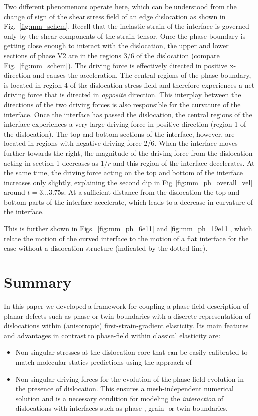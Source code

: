 \documentclass[preprint,review,3p,times,authoryear]{elsarticle}
\begin{document}
Two different phenomenons operate here, which can be understood from the change of sign of the shear stress field of an edge dislocation as shown in Fig.~\ref{fig:mm_schem}. Recall that the inelastic strain of the interface is governed only by the shear components of the strain tensor. Once the phase boundary is getting close enough to interact with the dislocation,  the upper and lower sections of phase V2 are in the regions 3/6 of the dislocation (compare Fig.~\ref{fig:mm_schem}). The driving force is effectively directed in positive x-direction and causes the acceleration. The central regions of the phase boundary, is located in region 4 of the dislocation stress field and therefore experiences a net driving force that is directed in \emph{opposite} direction. This interplay between the directions of the two driving forces is also responsible for the curvature of the interface. 
Once the interface has passed the dislocation, the central regions of the interface experiences a very large driving force in positive direction (region 1 of the dislocation). The top and bottom sections of the interface, however, are located in regions with negative driving force 2/6. 
When the interface moves further towards the right, the magnitude of the driving force from the dislocation acting in section 1 decreases as $1/r$ and this region of the interface decelerates. At the same time, the driving force acting on the top and bottom of the interface increases only slightly,  explaining the second dip in Fig~\ref{fig:mm_ph_overall_vel} around $t=3...3.75$\textmu s. At a sufficient distance from the dislocation the top and bottom parts of the interface accelerate, which leads to a decrease in curvature of the interface. 

 This is further shown in Figs.~\ref{fig:mm_ph_6e11} and \ref{fig:mm_ph_19e11}, which relate the motion of the curved interface to the motion of a flat interface for the case without a dislocation structure (indicated by the dotted line). 

\section{Summary}
\label{sec:summary}

In this paper we developed a framework for coupling a phase-field description of planar defects such as phase or twin-boundaries with a discrete representation of dislocations within (anisotropic) first-strain-gradient elasticity. Its main features and advantages in contrast to phase-field within classical elasticity are:
\begin{itemize}
\item Non-singular stresses at the dislocation core that can be easily calibrated to match molecular statics predictions using the approach of \cite{Admal:2017}
\item Non-singular driving forces for the evolution of the phase-field evolution in the presence of dislocation. This ensures a mesh-independent numerical solution and is a necessary condition for modeling the \emph{interaction} of dislocations with interfaces such as phase-, grain- or twin-boundaries. 
\end{itemize}
\end{document}
